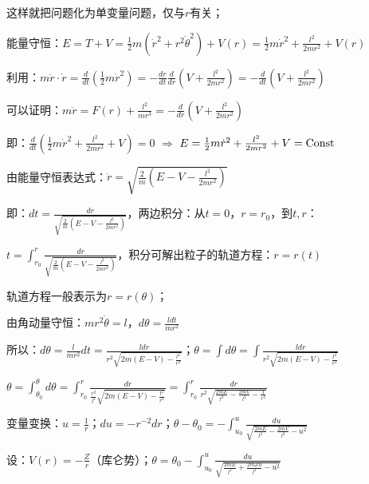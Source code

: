 这样就把问题化为单变量问题，仅与$r$有关；

能量守恒：$E = T + V = \frac{1}{2}m\left( {\dot r^2  + r^2 \dot \theta ^2 } \right) + V(r) = \frac{1}{2}m\dot r^2  + \frac{{l^2 }}{{2mr^2 }} + V(r)$

利用：$m\ddot r \cdot \dot r = \frac{d}{{dt}}\left( {\frac{1}{2}m\dot r^2 } \right) =  - \frac{{dr}}{{dt}}\frac{d}{{dr}}\left( {V + \frac{{l^2 }}{{2mr^2 }}} \right) =  - \frac{d}{{dt}}\left( {V + \frac{{l^2 }}{{2mr^2 }}} \right)$

可以证明：$m\ddot r = F(r) + \frac{{l^2 }}{{mr^3 }} =  - \frac{d}{{dr}}\left( {V + \frac{{l^2 }}{{2mr^2 }}} \right)$

即：$\frac{d}{{dt}}\left( {\frac{1}{2}m\dot r^2  + \frac{{l^2 }}{{2mr^2 }} + V} \right) = 0$
$ \Rightarrow $
$E = \frac{1}{2}m\dot r^2  + \frac{{l^2 }}{{2mr^2 }} + V = {\rm{Const}}$

由能量守恒表达式：$\dot r = \sqrt {\frac{2}{m}\left( {E - V - \frac{{l^2 }}{{2mr^2 }}} \right)} $

即：$dt = \frac{{dr}}{{\sqrt {\frac{2}{m}\left( {E - V - \frac{{l^2 }}{{2mr^2 }}} \right)} }}$，两边积分：从$t = 0$，$r = r_0 $，到$t,r$：


$t = \int_{r_0 }^r {\frac{{dr}}{{\sqrt {\frac{2}{m}\left( {E - V - \frac{{l^2 }}{{2mr^2 }}} \right)} }}} $，积分可解出粒子的轨道方程：$r = r(t)$

轨道方程一般表示为$r = r(\theta )$；

由角动量守恒：$mr^2 \dot \theta  = l$，$d\theta  = \frac{{ldt}}{{mr^2 }}$

所以：$d\theta  = \frac{l}{{mr^2 }}dt = \frac{{ldr}}{{r^2 \sqrt {2m\left( {E - V} \right) - \frac{{l^2 }}{{r^2 }}} }}$；$\theta  = \int {d\theta }  = \int {\frac{{ldr}}{{r^2 \sqrt {2m\left( {E - V} \right) - \frac{{l^2 }}{{r^2 }}} }}} $

$\theta  = \int_{\theta _0 }^\theta  {d\theta }  = \int_{r_0 }^r {\frac{{dr}}{{\frac{{r^2 }}{{l^2 }}\sqrt {2m\left( {E - V} \right) - \frac{{l^2 }}{{r^2 }}} }}}  = \int_{r_0 }^r {\frac{{dr}}{{r^2 \sqrt {\frac{{2mE}}{{l^2 }} - \frac{{2mV}}{{l^2 }} - \frac{1}{{r^2 }}} }}} $


变量变换：$u = \frac{1}{r}$；$du =  - r^{ - 2} dr$；$\theta  - \theta _0  =  - \int_{u_0 }^u {\frac{{du}}{{\sqrt {\frac{{2mE}}{{l^2 }} - \frac{{2mV}}{{l^2 }} - u^2 } }}} $

设：$V(r) =  - \frac{Z}{r}$（库仑势）；$\theta  = \theta _0  - \int_{u_0 }^u {\frac{{du}}{{\sqrt {\frac{{2mE}}{{l^2 }} + \frac{{2mZu}}{{l^2 }} - u^2 } }}} $

